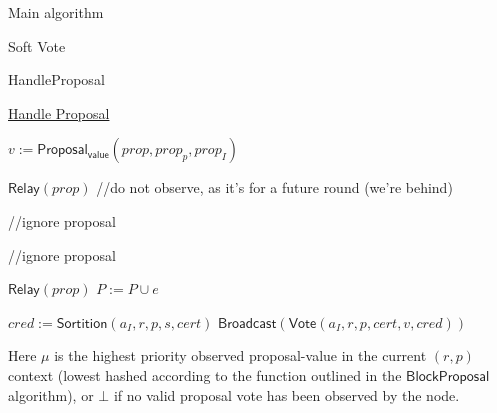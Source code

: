\documentclass[10pt,a4paper]{article}
\begin{document}
\begin{section}{Main algorithm}
\begin{subsection}{Soft Vote}
\end{subsection}

\begin{subsection}{HandleProposal}\label{ssect:handle-proposal}

    \begin{algorithm}[H]
        \caption{\underline{Handle Proposal}}
        \label{algo:handle-proposal}
        \begin{algorithmic}[1]

            \State $v :=  \mathsf{Proposal_{value}}(prop, prop_{p}, prop_{I})$

                \State $\mathsf{Relay}(prop)$  %
                \Return //do not observe, as it's for a future round (we're behind)
            \EndIf

                \Return //ignore proposal
            \EndIf

                \Return //ignore proposal
            \EndIf

            \State $\mathsf{Relay}(prop)$
            \State $P := P \cup e$

                    \State $cred := \mathsf{Sortition}(a_I, r,p,s, cert)$
                        \State $\mathsf{Broadcast}(\mathsf{Vote}(a_I, r, p, cert, v,  cred))$
                    \EndIf
                \EndFor    
            \EndIf

        \EndFunction
        \end{algorithmic}
    \end{algorithm}
    
    Here $\mu$ is the highest priority observed proposal-value in the current $(r,p)$ context 
    (lowest hashed according to the function outlined in the $\mathsf{BlockProposal}$ algorithm), 
    or $\bot$ if no valid proposal vote has been observed by the node.


\end{subsection}
\end{section}
\end{document}
